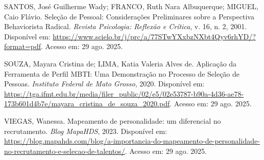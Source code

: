 \documentclass[12pt]{article}
\begin{document}
\begin{thebibliography}{99}
SANTOS, José Guilherme Wady; FRANCO, Ruth Nara Albuquerque; MIGUEL, Caio Flávio. Seleção de Pessoal: Considerações Preliminares sobre a Perspectiva Behaviorista Radical. \textit{Revista Psicologia: Reflexão e Crítica}, v. 16, n. 2, 2001. Disponível em: \url{https://www.scielo.br/j/prc/a/77STwYXxbzNXbt4Qyv6rhYD/?format=pdf}. Acesso em: 29 ago. 2025.

SOUZA, Mayara Cristina de; LIMA, Katia Valeria Alves de. Aplicação da Ferramenta de Perfil MBTI: Uma Demonstração no Processo de Seleção de Pessoas. \textit{Instituto Federal de Mato Grosso}, 2020. Disponível em: \url{https://tga.ifmt.edu.br/media/filer_public/02/e5/02e53787-b90a-4d36-ae78-173b601d4b7e/mayara_cristina_de_souza_2020.pdf}. Acesso em: 29 ago. 2025.

VIEGAS, Wanessa. Mapeamento de personalidade: um diferencial no recrutamento. \textit{Blog MapaHDS}, 2023. Disponível em: \url{https://blog.mapahds.com/blog/a-importancia-do-mapeamento-de-personalidade-no-recrutamento-e-selecao-de-talentos/}. Acesso em: 29 ago. 2025.
\end{thebibliography}
\end{document}
